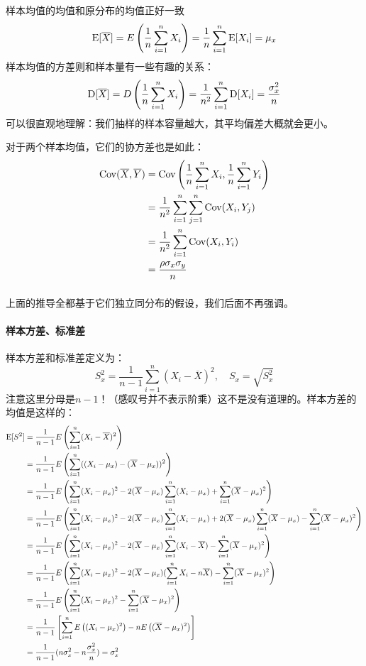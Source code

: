 样本均值的均值和原分布的均值正好一致
\[
\operatorname{E}[\overline{X}]=E\left(\frac 1n\sum_{i=1}^nX_i\right) = \frac 1n\sum_{i=1}^n\operatorname{E}[X_i]=\mu_x
\]
样本均值的方差则和样本量有一些有趣的关系：
\[
\operatorname{D}[\overline{X}]=D\left(\frac 1n\sum_{i=1}^nX_i\right) = \frac 1{n^2}\sum_{i=1}^n\operatorname{D}[X_i]=\frac{\sigma_x^2}{n}
\]
可以很直观地理解：我们抽样的样本容量越大，其平均偏差大概就会更小。

对于两个样本均值，它们的协方差也是如此：
\begin{align*}
\operatorname{Cov}(\overline{X},\overline{Y}) &= \operatorname{Cov}\left(\frac 1n\sum_{i=1}^nX_i,\frac 1n\sum_{i=1}^nY_i\right)\\
&=\frac 1{n^2}\sum_{i=1}^n\sum_{j=1}^n\operatorname{Cov}(X_i,Y_j)\\
&=\frac 1{n^2}\sum_{i=1}^n\operatorname{Cov}(X_i,Y_i)\\
&=\frac{\rho\sigma_x\sigma_y}{n}
\end{align*}
\[
\]

上面的推导全都基于它们独立同分布的假设，我们后面不再强调。

\paragraph{样本方差、标准差}
样本方差和标准差定义为：
\[
S^2_x=\frac{1}{n-1}\sum_{i=1}^n(X_i-\overline{X})^2,\quad S_x=\sqrt{S_x^2}
\]
注意这里分母是$n-1$！（感叹号并不表示阶乘）这不是没有道理的。样本方差的均值是这样的：
\begin{align*}
\operatorname{E}[S^2] &= \frac{1}{n-1}E\left(\sum_{i=1}^n(X_i-\overline{X})^2\right)\\
&= \frac{1}{n-1}E\left(\sum_{i=1}^n((X_i-\mu_x)-(\overline{X}-\mu_x))^2\right)\\
&= \frac{1}{n-1}E\left(\sum_{i=1}^n(X_i-\mu_x)^2-2(\overline{X}-\mu_x)\sum_{i=1}^n(X_i-\mu_x)+\sum_{i=1}^n(\overline{X}-\mu_x)^2\right)\\
&= \frac{1}{n-1}E\left(\sum_{i=1}^n(X_i-\mu_x)^2-2(\overline{X}-\mu_x)\sum_{i=1}^n(X_i-\mu_x)+2(\overline{X}-\mu_x)\sum_{i=1}^n(\overline{X}-\mu_x)-\sum_{i=1}^n(\overline{X}-\mu_x)^2\right)\\
&= \frac{1}{n-1}E\left(\sum_{i=1}^n(X_i-\mu_x)^2-2(\overline{X}-\mu_x)\sum_{i=1}^n(X_i-\overline{X})-\sum_{i=1}^n(\overline{X}-\mu_x)^2\right)\\
&= \frac{1}{n-1}E\left(\sum_{i=1}^n(X_i-\mu_x)^2-2(\overline{X}-\mu_x)(\sum_{i=1}^nX_i-n\overline{X})-\sum_{i=1}^n(\overline{X}-\mu_x)^2\right)\\
&= \frac{1}{n-1}E\left(\sum_{i=1}^n(X_i-\mu_x)^2-\sum_{i=1}^n(\overline{X}-\mu_x)^2\right)\\
&= \frac{1}{n-1}\left[\sum_{i=1}^nE\left((X_i-\mu_x)^2\right)-nE\left((\overline{X}-\mu_x)^2\right)\right]\\
&= \frac{1}{n-1}(n\sigma_x^2-n\frac{\sigma_x^2}{n}) =\sigma_x^2
\end{align*}

